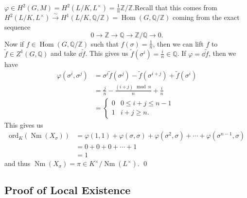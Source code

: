 \documentclass[leqno, openany]{memoir}
\theoremstyle{definition}
\theoremstyle{remark}
\theoremstyle{plain}
\theoremstyle{definition}
\theoremstyle{remark}
\newcommand{\Z}{\mathbb{Z}}
\newcommand{\Q}{\mathbb{Q}}
\newcommand{\mr}[1]{\mathrm{#1}}
\newcommand{\wt}[1]{\widetilde{#1}}
\DeclareMathOperator{\Hom}{Hom}
\DeclareMathOperator{\Nm}{Nm}
\begin{document}
    $\varphi \in H^2(G, M) = H^2(L/K, L^{\times}) = \frac{1}{n} \Z/\Z$.Recall
    that this comes from $H^2(L/K, L^{\times}) \xrightarrow{\sim} H^1(L/K,
    \Q/\Z) = \Hom(G, \Q/\Z)$ coming from the exact sequence \[ 0 \to \Z \to \Q
    \to \Z/\Q \to 0. \] Now if $f \in \Hom(G, \Q/\Z)$ such that $f(\sigma) =
    \frac{1}{n}$, then we can lift $f$ to $\wt{f} \in Z^1(G, \Q)$ and take
    $\dd{\wt{f}}$. This gives us $\wt{f}(\sigma^i) = \frac{i}{n} \in \Q$. If
    $\varphi = \dd{\wt{f}}$, then we have \begin{align*} \varphi(\sigma^i,
        \sigma^j) &= \sigma^i \wt{f}(\sigma^j)- \wt{f}(\sigma^{i+j}) +
        \wt{f}(\sigma^i) \\ &= \frac{j}{n} - \frac{(i+j) \mod n}{n} +
        \frac{i}{n} \\ &= \begin{cases} 0 & 0 \leq i+j \leq n-1 \\ 1 & i+j \geq
            n.  \end{cases} \end{align*} This gives us \begin{align*}
            \mr{ord}_K(\Nm(X_{\sigma})) &= \varphi(1,1) + \varphi(\sigma,
            \sigma) + \varphi(\sigma^2, \sigma) + \cdots +
            \varphi(\sigma^{n-1}, \sigma) \\ &= 0 + 0 + 0 + \cdots + 1 \\ &= 1
        \end{align*} and thus $\Nm(X_{\sigma}) = \pi \in
        K^{\times}/\Nm(L^{\times})$. \qed

\subsection{Proof of Local Existence}%
\end{document}
